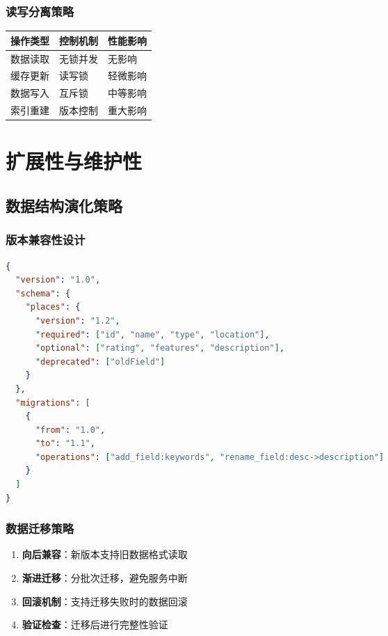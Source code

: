 \documentclass[12pt,a4paper]{article}
\begin{document}
\subsubsection{读写分离策略}
\begin{table}[H]
\centering
\begin{tcolorbox}[
    colback=light,
    colframe=warning,
    title={\textbf{并发控制策略}},
    coltitle=white,
    colbacktitle=warning,
    fonttitle=\bfseries,
    rounded corners=5pt,
    width=0.85\textwidth
]
\begin{tabular}{lll}
\toprule
\rowcolor{warning!20}
\textbf{操作类型} & \textbf{控制机制} & \textbf{性能影响} \\
\midrule
数据读取 & 无锁并发 & 无影响 \\
\rowcolor{light}
缓存更新 & 读写锁 & 轻微影响 \\
数据写入 & 互斥锁 & 中等影响 \\
\rowcolor{light}
索引重建 & 版本控制 & 重大影响 \\
\bottomrule
\end{tabular}
\end{tcolorbox}
\end{table}

\section{扩展性与维护性}

\subsection{数据结构演化策略}

\subsubsection{版本兼容性设计}
\begin{lstlisting}[language=json, caption={版本化数据结构}]
{
  "version": "1.0",
  "schema": {
    "places": {
      "version": "1.2",
      "required": ["id", "name", "type", "location"],
      "optional": ["rating", "features", "description"],
      "deprecated": ["oldField"]
    }
  },
  "migrations": [
    {
      "from": "1.0",
      "to": "1.1",
      "operations": ["add_field:keywords", "rename_field:desc->description"]
    }
  ]
}
\end{lstlisting}

\subsubsection{数据迁移策略}
\begin{enumerate}
    \item \textbf{向后兼容}：新版本支持旧数据格式读取
    \item \textbf{渐进迁移}：分批次迁移，避免服务中断
    \item \textbf{回滚机制}：支持迁移失败时的数据回滚
    \item \textbf{验证检查}：迁移后进行完整性验证
\end{enumerate}
\end{document}
